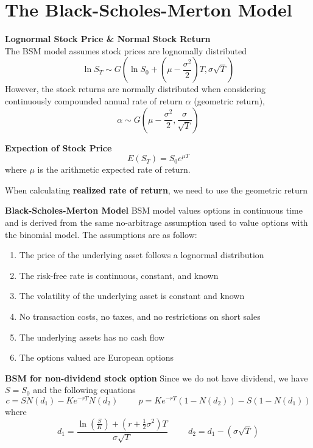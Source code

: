 \documentclass[11pt,fleqn]{book} %
\numberwithin{equation}{section} %
\numberwithin{figure}{section} %
\numberwithin{table}{section} %
\begin{document}
\chapter{The Black-Scholes-Merton Model}
 \begin{definition}\textbf{Lognormal Stock Price \& Normal Stock Return}\\
 The BSM model assumes stock prices are lognomally distributed
 $$
 \ln S_T\sim G\left(\ln S_0+\left(\mu-\frac{\sigma^2}{2}\right)T,\sigma\sqrt{T}\right)
 $$
 However, the stock returns are normally distributed when considering continuously compounded annual rate of return $\alpha$ (geometric return),
 $$
 \alpha\sim G\left(\mu-\frac{\sigma^2}{2},\frac{\sigma}{\sqrt{T}}\right)
 $$
 \end{definition}
 \begin{theorem}\textbf{Expection of Stock Price}
 $$
 E(S_T)=S_0e^{\mu T}
 $$
 where $\mu$ is the arithmetic expected rate of return.
 \end{theorem}
 \begin{remark}
 When calculating \textbf{realized rate of return}, we need to use the geometric return
 \end{remark}
 \begin{definition}\textbf{Black-Scholes-Merton Model}
 BSM model values options in continuous time and is derived from the same no-arbitrage assumption used to value options with the binomial model. The assumptions are as follow:
 \begin{enumerate}
     \item The price of the underlying asset follows a lognormal distribution
     \item The risk-free rate is continuous, constant, and known
     \item The volatility of the underlying asset is constant and known
     \item No transaction costs, no taxes, and no restrictions on short sales
     \item The underlying assets has no cash flow
     \item The options valued are European options
 \end{enumerate}
 \end{definition}
 \begin{theorem}\textbf{BSM for non-dividend stock option}
 Since we do not have dividend, we have $S=S_0$ and the following equations
 $$
 c=SN(d_1)-Ke^{-rT}N(d_2)\hspace{1cm}p=Ke^{-rT}(1-N(d_2))-S(1-N(d_1))
 $$
 where
 $$
 d_1=\frac{\ln\left(\frac{S}{K}\right)+(r+\frac{1}{2}\sigma^2)T}{\sigma\sqrt{T}}\hspace{1cm}d_2=d_1-(\sigma\sqrt{T})
 $$
 \end{theorem}
\end{document}

